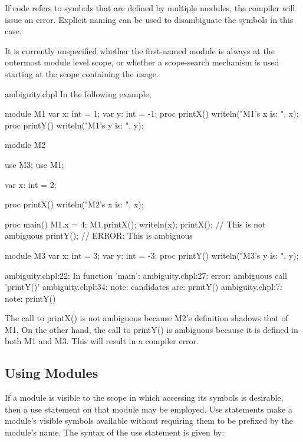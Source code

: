 If code refers to symbols that are defined by multiple modules, the
compiler will issue an error.  Explicit naming can be used to
disambiguate the symbols in this case.

\begin{openissue}
It is currently unspecified whether the
first-named module is always at the outermost module level scope, or whether a
scope-search mechanism is used starting at the scope containing the
usage.
\end{openissue}

\begin{chapelexample}{ambiguity.chpl}
In the following example,
\begin{chapel}
module M1 {
  var x: int = 1;
  var y: int = -1;
  proc printX() {
    writeln("M1's x is: ", x);
  }
  proc printY() {
    writeln("M1's y is: ", y);
  }
}
 
module M2 {
  use M3;
  use M1;

  var x: int = 2;

  proc printX() {
    writeln("M2's x is: ", x);
  }

  proc main() {
    M1.x = 4;
    M1.printX();
    writeln(x);
    printX(); // This is not ambiguous
    printY(); // ERROR: This is ambiguous
  }
}

module M3 {
  var x: int = 3;
  var y: int = -3;
  proc printY() {
    writeln("M3's y is: ", y);
  }
}
\end{chapel}
\begin{chapeloutput}
ambiguity.chpl:22: In function 'main':
ambiguity.chpl:27: error: ambiguous call 'printY()'
ambiguity.chpl:34: note: candidates are: printY()
ambiguity.chpl:7: note:                 printY()
\end{chapeloutput}
The call to printX() is not ambiguous because M2's definition shadows
that of M1.  On the other hand, the call to printY() is ambiguous
because it is defined in both M1 and M3.  This will result in a
compiler error.
\end{chapelexample}

\subsection{Using Modules}
\label{Using_Modules}

If a module is visible to the scope in which accessing its symbols is desirable,
then a use statement on that module may be employed.  Use statements
make a module's visible symbols available without requiring them to be
prefixed by the module's name.  The syntax of the use statement is
given by:

